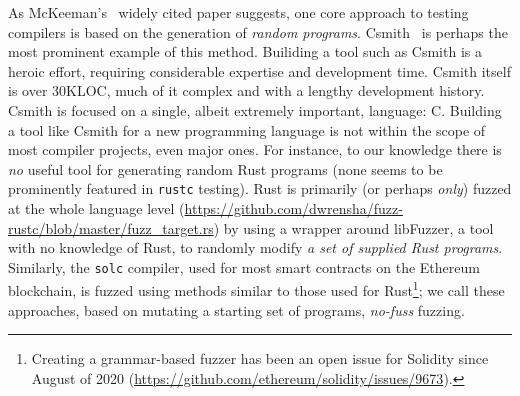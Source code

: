 As McKeeman's~\cite{Differential} widely cited paper suggests, one core approach to testing compilers is
based on
the generation of \emph{random programs}.  Csmith~\cite{csmith} is perhaps the most prominent
example of this method.  Builiding a tool such as Csmith
is a heroic effort, requiring considerable expertise and
development time.  Csmith itself is over 30KLOC, much of it complex
and with a lengthy development history.  Csmith is focused on a
single, albeit extremely important, language: C.  Building a tool like
Csmith for a new programming language is not within the scope of most
compiler projects, even major ones.  For instance, to our knowledge
there is \emph{no} useful tool for generating random Rust programs
(none seems to be
prominently featured in {\tt rustc} testing).  Rust
is primarily (or perhaps \emph{only}) fuzzed at the whole language
level
(\url{https://github.com/dwrensha/fuzz-rustc/blob/master/fuzz_target.rs}) by
using a wrapper around libFuzzer, a tool with no knowledge of Rust, to randomly modify \emph{a set of supplied Rust
programs}.  Similarly, the {\tt solc} compiler, used for most smart contracts on
the Ethereum blockchain, is fuzzed using methods similar to those used for
Rust\footnote{Creating a
grammar-based fuzzer has been an open issue for Solidity since August
of 2020 (\url{https://github.com/ethereum/solidity/issues/9673}).}; we
call these approaches, based on mutating a starting set of
programs, \emph{no-fuss} fuzzing.  

